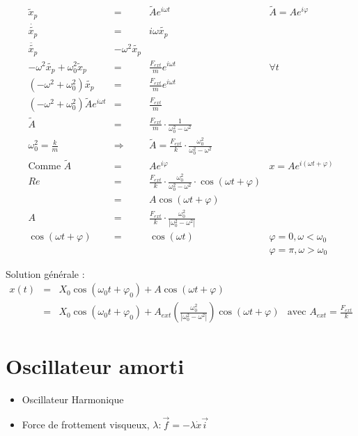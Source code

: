 \[\begin{array}{rccl}
		\tilde{x}_p &=& \tilde{A}e^{i\omega t} &\tilde{A} = A e^{i\varphi} \\
		\dot{\tilde{x_p}} &=& i \omega \tilde{x_p} \\
		\ddot{\tilde{x_p}} & -\omega^2 \tilde{x_p} \\
		-\omega^2 \tilde{x_p}+\omega_0^2\tilde{x}_p &=& \frac{F_{ext}}{m}e^{i\omega t} & \forall t \\
		(-\omega^2 + \omega_0^2)\tilde{x_p} &=& \frac{F_{ext}}{m} e^{i\omega t} \\
		(-\omega^2 + \omega_0^2) \tilde{A}e^{i\omega t} &=& \frac{F_{ext}}{m} \\
		\tilde{A} &=& \frac{F_{ext}}{m} \cdot \frac{1}{\omega_0^2 - \omega^2} \\
		\omega_0^2 = \frac{k}{m} & \Rightarrow & \tilde{A} = \frac{F_{ext}}{k}\cdot \frac{\omega_0^2}{\omega_0^2 - \omega^2} \\
		\text{Comme } \tilde{A} &=& Ae^{i\varphi} &  x = Ae^{i(\omega t + \varphi)}\\
		Re &=& \frac{F_{ext}}{k} \cdot \frac{\omega_0^2}{\omega_0^2 - \omega^2} \cdot \cos(\omega t + \varphi)\\
		   &=& A \cos(\omega t + \varphi) \\
		A &=&\frac{F_{ext}}{k} \cdot \frac{\omega_0^2}{|\omega_0^2 - \omega^2|} \\
		\cos(\omega t + \varphi) &=& \cos(\omega t) & \varphi = 0, \omega < \omega_0 \\
																					   &&& \varphi = \pi, \omega > \omega_0 \end{array}\]

		Solution générale :
		\[\begin{array}{rcl}
				x(t) &=& X_0\cos(\omega_0 t + \varphi_0) + A\cos(\omega t + \varphi) \\
						   &=& X_0\cos(\omega_0 t + \varphi_0) + A_{ext}(\frac{\omega_0^2}{|\omega_0^2 - \omega^2|}) \cos(\omega t + \varphi)& \text{avec } A_{ext} = \frac{F_{ext}}{k}
			\end{array}\]

	\section{Oscillateur amorti}

	\begin{itemize}
		\item Oscillateur Harmonique
		\item Force de frottement visqueux, $\lambda : \vec{f} = - \lambda \dot{x}\vec{i}$
	\end{itemize}

